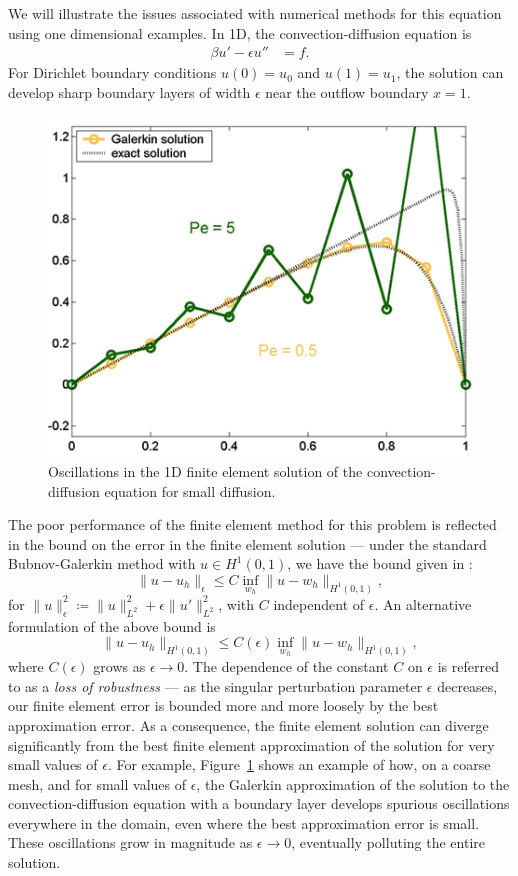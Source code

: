\documentclass{report}
\begin{document}
We will illustrate the issues associated with numerical methods for this equation using one dimensional examples.  In 1D, the convection-diffusion equation is
\begin{align*}
\beta u'-\epsilon u'' &= f.
\end{align*}
For Dirichlet boundary conditions $u(0)=u_0$ and $u(1)= u_1$, the solution can develop sharp boundary layers of width $\epsilon$ near the outflow boundary $x=1$. 

\begin{figure}[!h]
\centering
\includegraphics[scale=.4]{figs/GalerkinOscTight.png}
\caption{Oscillations in the 1D finite element solution of the convection-diffusion equation for small diffusion.}
\label{fig:GalerkinOsc}
\end{figure}

The poor performance of the finite element method for this problem is reflected in the bound on the error in the finite element solution --- under the standard Bubnov-Galerkin method with $u\in H^1(0,1)$, we have the bound given in \cite{roos2008robust}:
\[
\|u-u_h\|_\epsilon \leq C \inf_{w_h}\|u-w_h\|_{H^1(0,1)},
\]
for $\|u\|_\epsilon^2 \coloneqq \|u\|_{L^2}^2 + \epsilon \|u'\|_{L^2}^2$, with $C$ independent of $\epsilon$. An alternative formulation of the above bound is 
\[
\|u-u_h\|_{H^1(0,1)} \leq C(\epsilon) \inf_{w_h}\|u-w_h\|_{H^1(0,1)},
\]
where $C(\epsilon)$ grows as $\epsilon\rightarrow 0$. The dependence of the constant $C$ on $\epsilon$ is referred to as a \textit{loss of robustness} --- as the singular perturbation parameter $\epsilon$ decreases, our finite element error is bounded more and more loosely by the best approximation error.  As a consequence, the finite element solution can diverge significantly from the best finite element approximation of the solution for very small values of $\epsilon$.  For example, Figure~\ref{fig:GalerkinOsc} shows an example of how, on a coarse mesh, and for small values of $\epsilon$, the Galerkin approximation of the solution to the convection-diffusion equation with a boundary layer develops spurious oscillations everywhere in the domain, even where the best approximation error is small.  These oscillations grow in magnitude as $\epsilon \rightarrow 0$, eventually polluting the entire solution.  
\end{document}
